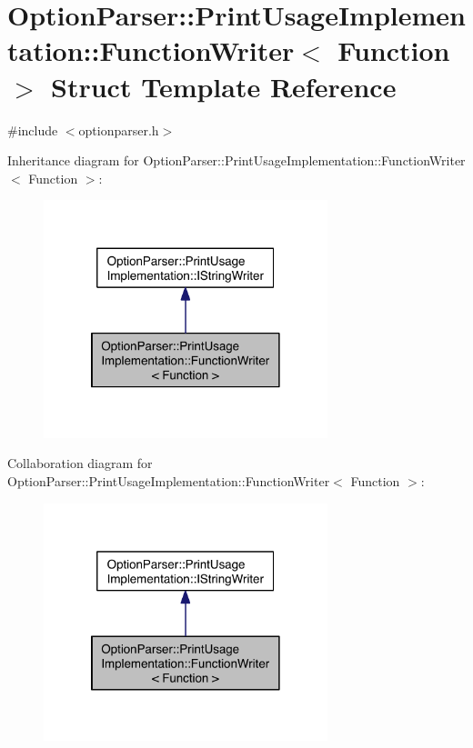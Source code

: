 \hypertarget{struct_option_parser_1_1_print_usage_implementation_1_1_function_writer}{\section{Option\-Parser\-:\-:Print\-Usage\-Implementation\-:\-:Function\-Writer$<$ Function $>$ Struct Template Reference}
\label{struct_option_parser_1_1_print_usage_implementation_1_1_function_writer}
}


{\ttfamily \#include $<$optionparser.\-h$>$}



Inheritance diagram for Option\-Parser\-:\-:Print\-Usage\-Implementation\-:\-:Function\-Writer$<$ Function $>$\-:\nopagebreak
\begin{figure}[H]
\begin{center}
\leavevmode
\includegraphics[width=234pt]{struct_option_parser_1_1_print_usage_implementation_1_1_function_writer__inherit__graph}
\end{center}
\end{figure}


Collaboration diagram for Option\-Parser\-:\-:Print\-Usage\-Implementation\-:\-:Function\-Writer$<$ Function $>$\-:\nopagebreak
\begin{figure}[H]
\begin{center}
\leavevmode
\includegraphics[width=234pt]{struct_option_parser_1_1_print_usage_implementation_1_1_function_writer__coll__graph}
\end{center}
\end{figure}
